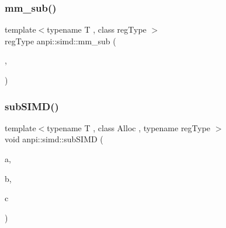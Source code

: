 \mbox{\label{namespaceanpi_1_1simd_a666e87726d6f06b283cf78e9635e0158}} 
\subsubsection{\texorpdfstring{mm\+\_\+sub()}{mm\_sub()}}
{\footnotesize\ttfamily template$<$typename T , class reg\+Type $>$ \\
reg\+Type anpi\+::simd\+::mm\+\_\+sub (\begin{DoxyParamCaption}\item[{reg\+Type}]{,  }\item[{reg\+Type}]{ }\end{DoxyParamCaption})}

\mbox{\label{namespaceanpi_1_1simd_a6637f725450fe3bbc39506a28152264f}} 
\subsubsection{\texorpdfstring{sub\+S\+I\+M\+D()}{subSIMD()}}
{\footnotesize\ttfamily template$<$typename T , class Alloc , typename reg\+Type $>$ \\
void anpi\+::simd\+::sub\+S\+I\+MD (\begin{DoxyParamCaption}\item[{const \hyperlink{classanpi_1_1Matrix}{Matrix}$<$ T, Alloc $>$ \&}]{a,  }\item[{const \hyperlink{classanpi_1_1Matrix}{Matrix}$<$ T, Alloc $>$ \&}]{b,  }\item[{\hyperlink{classanpi_1_1Matrix}{Matrix}$<$ T, Alloc $>$ \&}]{c }\end{DoxyParamCaption})\hspace{0.3cm}{\ttfamily [inline]}}

\mbox{\label{namespaceanpi_1_1simd_a78848ed9be16434f4e6ee7ca6f56f14d}} 
